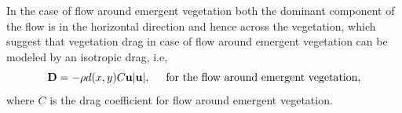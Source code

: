 \documentclass[12pt]{report}   %
\newcommand{\bn}{{\boldsymbol{\hat{n}}}}
\newcommand{\bt}{{\boldsymbol{\hat{t}}}}
\newcommand{\bu}{\mathbf{u}}
\newcommand{\monami}{\textit{monami}}
\begin{document}
In the case of flow around emergent vegetation both the dominant component of the flow is in the horizontal direction and hence across the vegetation, which suggest that vegetation drag in case of flow around emergent vegetation can be modeled by an isotropic drag, i.e,
\begin{equation}
 \mathbf{D} = -\rho d(x,y) C \bu |\bu| , \hspace{.5cm} \text{for the flow around emergent vegetation,}
\end{equation}
where $C$ is the drag coefficient for flow around emergent vegetation.
\end{document}
